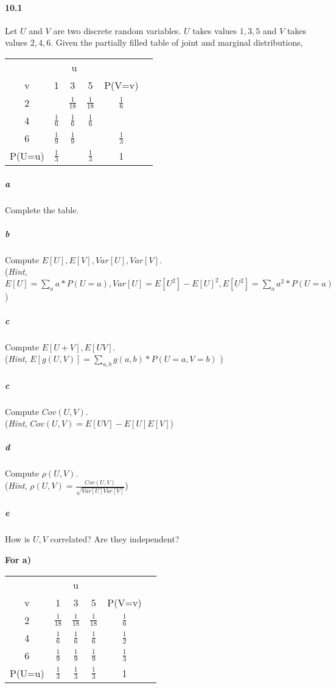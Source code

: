 \documentclass[11pt]{article} %
\begin{document}
\paragraph*{10.1} Let $U$ and $V$ are two discrete random variables. $U$ takes values $1, 3, 5$ and $V$ takes values $2, 4, 6$. Given the partially filled table of joint and marginal distributions, 
\begin{table}[h!]
\centering
\renewcommand{\arraystretch}{1.5}
\begin{tabular}{cccccc}
\hline \hline 
 &  \multicolumn{3}{c}{u} \\ \cline{2-4} 
v & 1 & 3 & 5 & P(V=v) \\ \hline
2 & & $\frac{1}{18}$ & $\frac{1}{18}$ & $\frac{1}{6}$ \\ 
4 & $\frac{1}{6}$ & $\frac{1}{6}$ & $\frac{1}{6}$ &  \\  
6 & $\frac{1}{9}$ & $\frac{1}{9}$ & & $\frac{1}{3}$ \\ \hline
P(U=u) & $\frac{1}{3}$ &  & $\frac{1}{3}$ & 1 \\ \hline \hline
\end{tabular}
\end{table}
\subparagraph*{a} Complete the table. 
\subparagraph*{b} Compute $E[U], E[V], Var[U], Var[V]$. \\(\textit{Hint}, $E[U] = \sum_a a*P(U=a), Var[U]=E[U^2] - E[U]^2, E[U^2]=\sum_a a^2*P(U=a)$)
\subparagraph*{c} Compute $E[U + V], E[UV]$. \\(\textit{Hint}, $E[g(U, V)] = \sum_{a,b}g(a,b) *P(U=a, V=b)$ )
\subparagraph*{c} Compute $Cov(U, V)$. \\(\textit{Hint}, $Cov(U,V) = E[UV] - E[U]E[V]$)
\subparagraph*{d} Compute $\rho(U, V)$. \\(\textit{Hint}, $\rho(U, V) = \frac{Cov(U,V)}{\sqrt{Var[U]Var[V]}}$)
\subparagraph*{e} How is $U,V$ correlated? Are they independent? 

{\bf For a)}\\
\begin{table}[h!]
\centering
\renewcommand{\arraystretch}{1.5}
\begin{tabular}{cccccc}
\hline \hline 
 &  \multicolumn{3}{c}{u} \\ \cline{2-4} 
v & 1 & 3 & 5 & P(V=v) \\ \hline
2 & $\frac{1}{18}$ & $\frac{1}{18}$ & $\frac{1}{18}$ & $\frac{1}{6}$ \\ 
4 & $\frac{1}{6}$ & $\frac{1}{6}$ & $\frac{1}{6}$ & $\frac{1}{2}$ \\  
6 & $\frac{1}{9}$ & $\frac{1}{9}$ & $\frac{1}{9}$ & $\frac{1}{3}$ \\ \hline
P(U=u) & $\frac{1}{3}$ & $\frac{1}{3}$ & $\frac{1}{3}$ & 1 \\ \hline \hline
\end{tabular}
\end{table}
\end{document}

